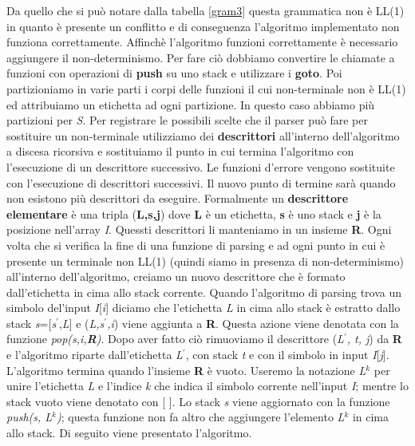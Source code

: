 Da quello che si può notare dalla tabella \ref{gram3} questa grammatica non è LL(1) in quanto è presente un conflitto e di conseguenza l'algoritmo implementato non funziona correttamente. Affinchè l'algoritmo funzioni correttamente è necessario aggiungere il non-determinismo. Per fare ciò dobbiamo convertire le chiamate a funzioni con operazioni di \textbf{push} su  uno stack e utilizzare i \textbf{goto}. Poi partizioniamo in varie parti i corpi delle funzioni il cui non-terminale non è LL(1) ed attribuiamo un etichetta ad ogni partizione. In questo caso abbiamo più partizioni per \textit{S}. Per registrare le possibili scelte che il parser può fare per sostituire un non-terminale utilizziamo dei \textbf{descrittori} all'interno dell'algoritmo a discesa ricorsiva e sostituiamo il punto in cui termina l'algoritmo con l'esecuzione di un descrittore successivo. Le funzioni d'errore vengono sostituite con l'esecuzione di descrittori successivi. Il nuovo punto di termine sarà quando non esistono più descrittori da eseguire. Formalmente un \textbf{descrittore elementare} è una tripla (\textbf{L,s,j}) dove \textbf{L} è un etichetta, \textbf{s} è uno stack e \textbf{j} è la posizione nell'array \textit{I}. Quessti descrittori li manteniamo in un insieme \textbf{R}. Ogni volta che si verifica la fine di una funzione di parsing e ad ogni punto in cui è presente un terminale non LL(1) (quindi siamo in presenza di non-determinismo) all'interno dell'algoritmo, creiamo un nuovo descrittore che è formato dall'etichetta in cima allo stack corrente. Quando l'algoritmo di parsing trova un simbolo del'input \textit{I}[\textit{i}] diciamo che l'etichetta \textit{L} in cima allo stack è estratto dallo stack \textit{s}=[\textit{s$^{'}$},\textit{L}] e (\textit{L,s$^{'}$,i}) viene aggiunta a \textbf{R}. Questa azione viene denotata con la funzione \textit{pop(s,i,\textbf{R})}. Dopo aver fatto ciò rimuoviamo il descrittore (\textit{L$^{'}$, t, j}) da \textbf{R} e l'algoritmo riparte dall'etichetta \textit{L$^{'}$}, con stack \textit{t} e con il simbolo in input \textit{I}[\textit{j}]. L'algoritmo termina quando l'insieme \textbf{R} è vuoto. Useremo la notazione \textit{L}$^{k}$ per unire l'etichetta \textit{L} e l'indice \textit{k} che indica il simbolo corrente nell'input \textit{I}; mentre lo stack vuoto viene denotato con [ ]. Lo stack \textit{s} viene aggiornato con la funzione \textit{push(s, L$^{k}$)}; questa funzione non fa altro che aggiungere  l'elemento \textit{L}$^{k}$ in cima allo stack. Di seguito viene presentato l'algoritmo.\par
